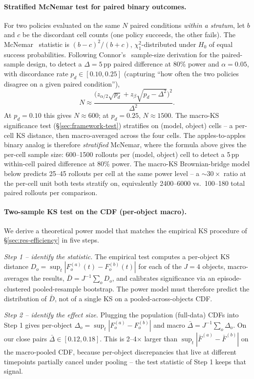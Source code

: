 \documentclass{article}
\begin{document}
\paragraph{Stratified McNemar test for paired binary outcomes.} For two policies evaluated on the same $N$ paired conditions \emph{within a stratum}, let $b$ and $c$ be the discordant cell counts (one policy succeeds, the other fails). The McNemar~\cite{mcnemar1947} statistic is $(b - c)^2 / (b + c)$, $\chi^2_1$-distributed under $H_0$ of equal success probabilities. Following Connor's~\cite{connor1987} sample-size derivation for the paired-sample design, to detect a $\Delta = 5$\,pp paired difference at 80\% power and $\alpha = 0.05$, with discordance rate $p_d \in [0.10, 0.25]$ (capturing ``how often the two policies disagree on a given paired condition''),
\[
N \approx \frac{\big(z_{\alpha/2}\sqrt{p_d} + z_\beta \sqrt{p_d - \Delta^2}\big)^2}{\Delta^2}.
\]
At $p_d = 0.10$ this gives $N \approx 600$; at $p_d = 0.25$, $N \approx 1500$. The macro-KS significance test (\S\ref{sec:framework-test}) stratifies on (model, object) cells -- a per-cell KS distance, then macro-averaged across the four cells. The apples-to-apples binary analog is therefore \emph{stratified} McNemar, where the formula above gives the per-cell sample size: 600--1500 rollouts per (model, object) cell to detect a 5\,pp within-cell paired difference at 80\% power. The macro-KS Brownian-bridge model below predicts 25--45 rollouts per cell at the same power level -- a ${\sim}30\times$ ratio at the per-cell unit both tests stratify on, equivalently 2400--6000 vs.\ 100--180 total paired rollouts per comparison.

\paragraph{Two-sample KS test on the CDF (per-object macro).} We derive a theoretical power model that matches the empirical KS procedure of \S\ref{sec:res-efficiency} in five steps.

\emph{Step 1 -- identify the statistic.} The empirical test computes a per-object KS distance $D_o = \sup_t |F^{(a)}_o(t) - F^{(b)}_o(t)|$ for each of the $J{=}4$ objects, macro-averages the results, $\bar D = J^{-1}\sum_o D_o$, and calibrates significance via an episode-clustered pooled-resample bootstrap. The power model must therefore predict the distribution of $\bar D$, not of a single KS on a pooled-across-objects CDF.

\emph{Step 2 -- identify the effect size.} Plugging the population (full-data) CDFs into Step 1 gives per-object $\Delta_o = \sup_t |F^{(a)}_o - F^{(b)}_o|$ and macro $\bar\Delta = J^{-1}\sum_o \Delta_o$. On our close pairs $\bar\Delta \in [0.12, 0.18]$. This is 2--4$\times$ larger than $\sup_t |\bar F^{(a)} - \bar F^{(b)}|$ on the macro-pooled CDF, because per-object discrepancies that live at different timepoints partially cancel under pooling -- the test statistic of Step 1 keeps that signal.
\end{document}
